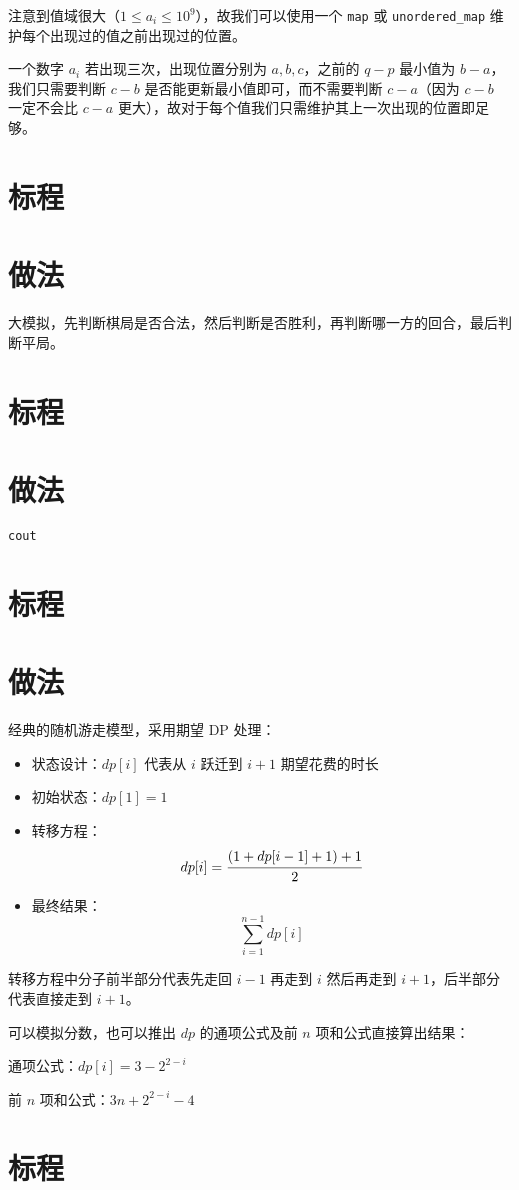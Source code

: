 \documentclass{../cpct/ctsol}
\begin{document}
注意到值域很大（$1 \leq a_i \leq {10}^9$），故我们可以使用一个 \lstinline{map} 或 \lstinline{unordered_map} 维护每个出现过的值之前出现过的位置。

一个数字 $a_i$ 若出现三次，出现位置分别为 $a,b,c$，之前的 $q-p$ 最小值为 $b-a$，我们只需要判断 $c-b$ 是否能更新最小值即可，而不需要判断 $c-a$（因为 $c-b$ 一定不会比 $c-a$ 更大），故对于每个值我们只需维护其上一次出现的位置即足够。

\section*{标程}


\makesolution
\section*{做法}

大模拟，先判断棋局是否合法，然后判断是否胜利，再判断哪一方的回合，最后判断平局。

\section*{标程}


\makesolution
\section*{做法}

\verb|cout|

\section*{标程}


\makesolution
\section*{做法}

经典的随机游走模型，采用期望 DP 处理：

\begin{itemize}
    \item 状态设计：$dp[i]$ 代表从 $i$ 跃迁到 $i+1$ 期望花费的时长
    \item 初始状态：$dp[1] = 1$
    \item 转移方程：$$dp[i] = \cfrac{(1+dp[i-1]+1)+1}{2}$$
    \item 最终结果：$$\sum\limits_{i=1}^{n-1} dp[i]$$
\end{itemize}

转移方程中分子前半部分代表先走回 $i-1$ 再走到 $i$ 然后再走到 $i+1$，后半部分代表直接走到 $i+1$。

可以模拟分数，也可以推出 $dp$ 的通项公式及前 $n$ 项和公式直接算出结果：

通项公式：$dp[i] = 3-2^{2-i}$

前 $n$ 项和公式：$3n+2^{2-i}-4$

\section*{标程}

\end{document}
